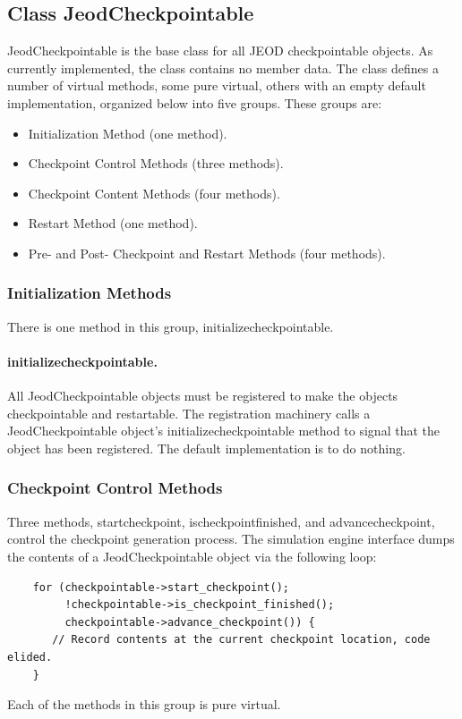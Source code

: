 \clearpage

\subsection{Class JeodCheckpointable}
\label{sec:spec_JeodCheckpointable}
JeodCheckpointable is the base class for all JEOD checkpointable objects.
As currently implemented, the class contains no member data.
The class defines a number of virtual methods, some pure virtual, others
with an empty default implementation, organized below into five groups.
These groups are:
\begin{itemize}
\item Initialization Method (one method).
\item Checkpoint Control Methods (three methods).
\item Checkpoint Content Methods (four methods).
\item Restart Method (one method).
\item Pre- and Post- Checkpoint and Restart Methods (four methods).
\end{itemize}

\subsubsection{Initialization Methods}
There is one method in this group, initialize\funder{}checkpointable.
\paragraph{initialize\funder{}checkpointable.}
All JeodCheckpointable objects must be registered to make the objects
checkpointable and restartable. The registration machinery calls a
JeodCheckpointable object's initialize\funder{}checkpointable method to signal
that the object has been registered.
The default implementation is to do nothing.

\subsubsection{Checkpoint Control Methods}
Three methods,
start\funder{}checkpoint,
is\funder{}checkpoint\funder{}finished, and
advance\funder{}checkpoint,
control the checkpoint generation process.
The simulation engine interface dumps the contents of a JeodCheckpointable
object via the following loop:
    \begin{verbatim}
    for (checkpointable->start_checkpoint();
         !checkpointable->is_checkpoint_finished();
         checkpointable->advance_checkpoint()) {
       // Record contents at the current checkpoint location, code elided.
    }   
    \end{verbatim}
Each of the methods in this group is pure virtual.

